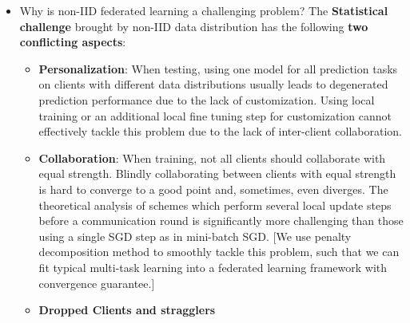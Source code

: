 {\begin{itemize}
    \item Why is non-IID federated learning a challenging problem? 
    The \textbf{Statistical challenge} brought by non-IID data distribution has the following \textbf{two conflicting aspects}:
    \begin{itemize}
        \item \textbf{Personalization}: When testing, using one model for all prediction tasks on clients with different data distributions usually leads to degenerated prediction performance due to the lack of customization. Using local training or an additional local fine tuning step for customization cannot effectively tackle this problem due to the lack of inter-client collaboration.
        \item \textbf{Collaboration}: When training, not all clients should collaborate with equal strength. Blindly collaborating between clients with equal strength is hard to converge to a good point and, sometimes, even diverges. The theoretical analysis of schemes which perform several local update steps before a communication round is significantly more challenging than those using a single SGD step as in mini-batch SGD. [We use penalty decomposition method to smoothly tackle this problem, such that we can fit typical multi-task learning into a federated learning framework with convergence guarantee.]
        \item \textbf{Dropped Clients and stragglers}
    \end{itemize}
\end{itemize}
}


